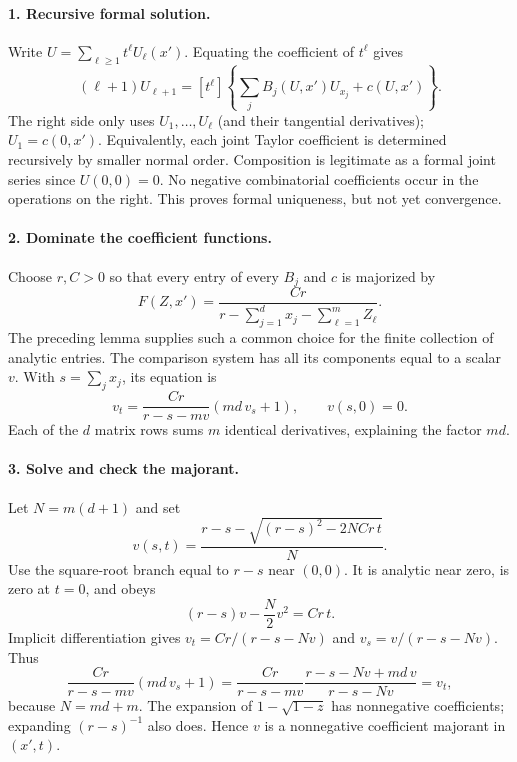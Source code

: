 \begin{expandedproof}
\paragraph{1. Recursive formal solution.}
Write $U=\sum_{\ell\geq1}t^\ell U_\ell(x')$.
Equating the coefficient of $t^\ell$ gives
\[
 (\ell+1)U_{\ell+1}
 =[t^\ell]\left\{\sum_jB_j(U,x')U_{x_j}+c(U,x')\right\}.
\]
The right side only uses $U_1,\ldots,U_\ell$ (and their tangential
derivatives); $U_1=c(0,x')$.
Equivalently, each joint Taylor coefficient is determined recursively
by smaller normal order.
Composition is legitimate as a formal joint series since $U(0,0)=0$.
No negative combinatorial coefficients occur in the operations on
the right. This proves formal uniqueness, but not yet convergence.

\paragraph{2. Dominate the coefficient functions.}
Choose $r,C>0$ so that every entry of every $B_j$ and $c$ is
majorized by
\[
 F(Z,x')=\frac{Cr}{r-\sum_{j=1}^dx_j-\sum_{\ell=1}^mZ_\ell}.
\]
The preceding lemma supplies such a common choice for the finite
collection of analytic entries.
The comparison system has all its components equal to a scalar $v$.
With $s=\sum_jx_j$, its equation is
\[
 v_t=\frac{Cr}{r-s-mv}(md\,v_s+1),\qquad v(s,0)=0.
 \tag{MAJ4}
\]
Each of the $d$ matrix rows sums $m$ identical derivatives, explaining
the factor $md$.

\paragraph{3. Solve and check the majorant.}
Let $N=m(d+1)$ and set
\[
 v(s,t)=\frac{r-s-\sqrt{(r-s)^2-2NCr\,t}}N .
\]
Use the square-root branch equal to $r-s$ near $(0,0)$.
It is analytic near zero, is zero at $t=0$, and obeys
\[
 (r-s)v-\frac N2v^2=Cr\,t .
\]
Implicit differentiation gives
$v_t=Cr/(r-s-Nv)$ and $v_s=v/(r-s-Nv)$.
Thus
\[
 \frac{Cr}{r-s-mv}(md\,v_s+1)
 =\frac{Cr}{r-s-mv}
   \frac{r-s-Nv+md\,v}{r-s-Nv}=v_t,
\]
because $N=md+m$.
The expansion of $1-\sqrt{1-z}$ has nonnegative coefficients;
expanding $(r-s)^{-1}$ also does. Hence $v$ is a nonnegative
coefficient majorant in $(x',t)$.


\end{expandedproof}

